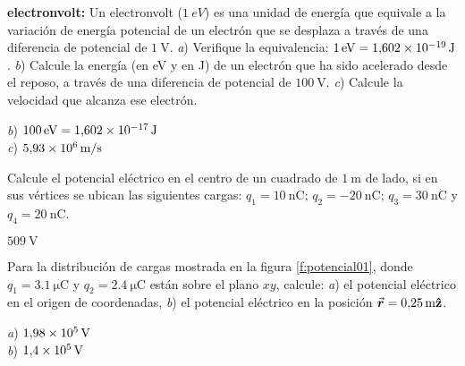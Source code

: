 %
\begin{Exercise}
  \textbf{electronvolt:} Un electronvolt ($\SI{1}{eV}$) es una unidad de energía que equivale a la variación de energía potencial de un electrón que se desplaza a través de una diferencia de potencial de $\SI{1}{\volt}$. \textit{a}) Verifique la equivalencia: $\SI{1}{eV} = \SI{1.602E-19}{\joule}$. \textit{b}) Calcule la energía (en eV y en J) de un electrón que ha sido acelerado desde el reposo, a través de una diferencia de potencial de $\SI{100}{\volt}$. \textit{c}) Calcule la velocidad que alcanza ese electrón.
\end{Exercise}
\begin{Answer}
	\begin{minipage}[t]{.4\textwidth}
    \textit{b}) $\SI{100}{eV} = \SI{1.602E-17}{\joule}$\\ \textit{c}) $\SI{5.93E6}{\metre/\second}$
  \end{minipage}
\end{Answer}
%
\begin{Exercise}
  Calcule el potencial eléctrico en el centro de un cuadrado de $\SI{1}{\metre}$ de lado, si en sus vértices se ubican las siguientes cargas: $q_1 = \SI{10}{\nano\coulomb}$; $q_2 = \SI{-20}{\nano\coulomb}$; $q_3 = \SI{30}{\nano\coulomb}$ y $q_4 = \SI{20}{\nano\coulomb}$.
\end{Exercise}
\begin{Answer}
  $\SI{509}{\volt}$
\end{Answer}
%
\begin{Exercise}\label{p:potencial01}
  Para la distribución de cargas mostrada en la figura \ref{f:potencial01}, donde $q_1 = \SI{3.1}{\micro\coulomb}$ y $q_2 = \SI{2.4}{\micro\coulomb}$ están sobre el plano $xy$, calcule: \textit{a}) el potencial eléctrico en el origen de coordenadas, \textit{b}) el potencial eléctrico en la posición $\va*{r} =\SI{0.25}{\metre}\vu{z}$.
\end{Exercise}
\begin{Answer}
	\begin{minipage}[t]{.4\textwidth}
    \textit{a}) $\SI{1.98E5}{\volt}$\\ \textit{b}) $\SI{1.4E5}{\volt}$
  \end{minipage}
\end{Answer}
%
\begin{minipage}[t]{.5\textwidth}
\begin{center}
\end{center}
\end{minipage}

